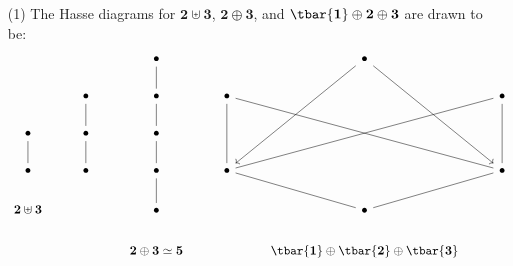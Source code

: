 \begin{example}\label{example_1.11}
  \begin{enumerate}
    \item[(1)] The Hasse diagrams for $\mathbf{2} \uplus \mathbf{3}$,
      $\mathbf{2} \oplus \mathbf{3}$, and $\tbar{\mathbf{1}} \oplus
      \mathbf{2} \oplus \mathbf{3}$ are drawn to be:
      \[\begin{tikzcd}
        && \bullet && \bullet \\
        & \bullet & \bullet & \bullet && \bullet \\
        \bullet & \bullet & \bullet \\
        \bullet & \bullet & \bullet & \bullet && \bullet \\
        {\mathbf{2} \uplus \mathbf{3}} && \bullet && \bullet \\
        && {\mathbf{2} \oplus \mathbf{3} \simeq \mathbf{5}} && {\tbar{\mathbf{1}} \oplus \tbar{\mathbf{2}} \oplus \tbar{\mathbf{3}}}
        \arrow[from=1-5, to=4-4]
        \arrow[from=1-5, to=4-6]
        \arrow[no head, from=2-3, to=1-3]
        \arrow[no head, from=3-2, to=2-2]
        \arrow[no head, from=3-3, to=2-3]
        \arrow[no head, from=4-1, to=3-1]
        \arrow[no head, from=4-2, to=3-2]
        \arrow[no head, from=4-3, to=3-3]
        \arrow[no head, from=4-4, to=2-4]
        \arrow[no head, from=4-4, to=2-6]
        \arrow[no head, from=4-6, to=2-4]
        \arrow[no head, from=4-6, to=2-6]
        \arrow[no head, from=5-3, to=4-3]
        \arrow[no head, from=5-5, to=4-4]
        \arrow[no head, from=5-5, to=4-6]
      \end{tikzcd}\]


\end{enumerate}
\end{example}
